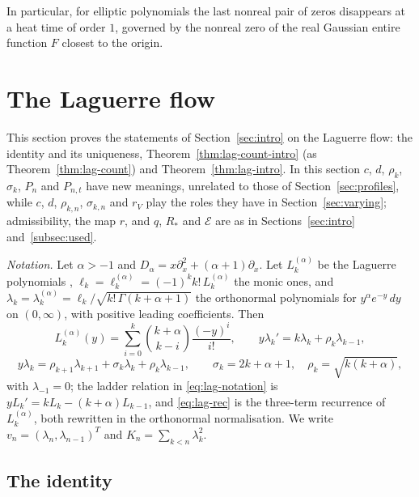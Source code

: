 \documentclass[11pt]{amsart}
\theoremstyle{definition}
\theoremstyle{remark}
\numberwithin{equation}{section}
\begin{document}
In particular, for elliptic polynomials the last nonreal pair of zeros disappears at a heat time of order $1$, governed by the nonreal zero of the real Gaussian entire function $F$ closest to the origin.

\section{The Laguerre flow}\label{sec:laguerre}

This section proves the statements of Section~\ref{sec:intro} on the Laguerre flow: the identity and its uniqueness, Theorem~\ref{thm:lag-count-intro} (as Theorem~\ref{thm:lag-count}) and Theorem~\ref{thm:lag-intro}. In this section $c$, $d$, $\rho_k$, $\sigma_k$, $P_n$ and $P_{n,t}$ have new meanings, unrelated to those of Section~\ref{sec:profiles}, while $c$, $d$, $\rho_{k,n}$, $\sigma_{k,n}$ and $r_V$ play the roles they have in Section~\ref{sec:varying}; admissibility, the map $r$, and $q$, $R_*$ and $\mathcal E$ are as in Sections~\ref{sec:intro} and~\ref{subsec:used}.

\emph{Notation.} Let $\alpha>-1$ and $D_\alpha=x\partial_x^2+(\alpha+1)\partial_x$. Let $L^{(\alpha)}_k$ be the Laguerre polynomials \cite[Section~5.1]{Sz}, $\ell_k=\ell^{(\alpha)}_k=(-1)^kk!\,L^{(\alpha)}_k$ the monic ones, and $\lambda_k=\lambda^{(\alpha)}_k=\ell_k/\sqrt{k!\,\Gamma(k+\alpha+1)}$ the orthonormal polynomials for $y^\alpha e^{-y}\,dy$ on $(0,\infty)$, with positive leading coefficients. Then
\begin{equation}\label{eq:lag-notation}
L^{(\alpha)}_k(y)=\sum_{i=0}^{k}\binom{k+\alpha}{k-i}\frac{(-y)^i}{i!},\qquad y\lambda_k'=k\lambda_k+\rho_k\lambda_{k-1},
\end{equation}
\begin{equation}\label{eq:lag-rec}
y\lambda_k=\rho_{k+1}\lambda_{k+1}+\sigma_k\lambda_k+\rho_k\lambda_{k-1},\qquad\sigma_k=2k+\alpha+1,\quad\rho_k=\sqrt{k(k+\alpha)},
\end{equation}
with $\lambda_{-1}=0$; the ladder relation in \eqref{eq:lag-notation} is $yL_k'=kL_k-(k+\alpha)L_{k-1}$, and \eqref{eq:lag-rec} is the three-term recurrence of $L^{(\alpha)}_k$, both rewritten in the orthonormal normalisation. We write $v_n=(\lambda_n,\lambda_{n-1})^T$ and $K_n=\sum_{k<n}\lambda_k^2$.

\subsection{The identity}\label{subsec:lag-identity}
\end{document}
